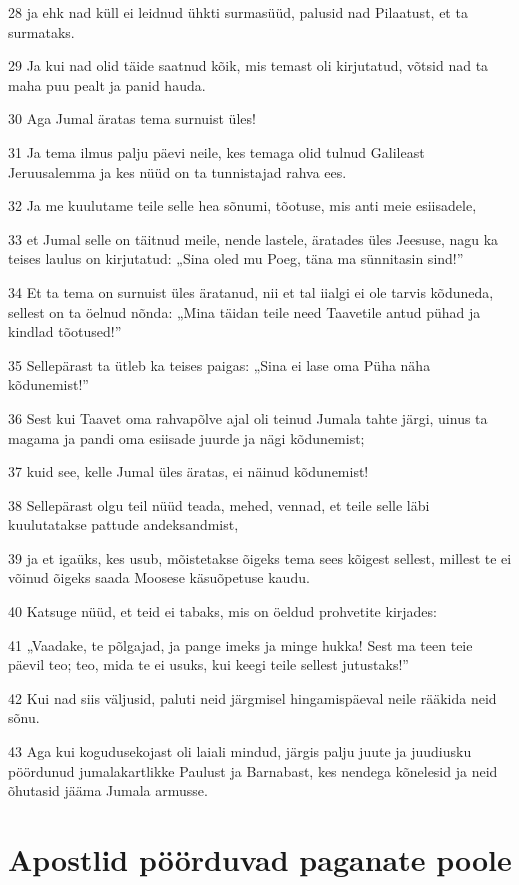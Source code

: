 \par 28 ja ehk nad küll ei leidnud ühkti surmasüüd, palusid nad Pilaatust, et ta surmataks.
\par 29 Ja kui nad olid täide saatnud kõik, mis temast oli kirjutatud, võtsid nad ta maha puu pealt ja panid hauda.
\par 30 Aga Jumal äratas tema surnuist üles!
\par 31 Ja tema ilmus palju päevi neile, kes temaga olid tulnud Galileast Jeruusalemma ja kes nüüd on ta tunnistajad rahva ees.
\par 32 Ja me kuulutame teile selle hea sõnumi, tõotuse, mis anti meie esiisadele,
\par 33 et Jumal selle on täitnud meile, nende lastele, äratades üles Jeesuse, nagu ka teises laulus on kirjutatud: „Sina oled mu Poeg, täna ma sünnitasin sind!”
\par 34 Et ta tema on surnuist üles äratanud, nii et tal iialgi ei ole tarvis kõduneda, sellest on ta öelnud nõnda: „Mina täidan teile need Taavetile antud pühad ja kindlad tõotused!”
\par 35 Sellepärast ta ütleb ka teises paigas: „Sina ei lase oma Püha näha kõdunemist!”
\par 36 Sest kui Taavet oma rahvapõlve ajal oli teinud Jumala tahte järgi, uinus ta magama ja pandi oma esiisade juurde ja nägi kõdunemist;
\par 37 kuid see, kelle Jumal üles äratas, ei näinud kõdunemist!
\par 38 Sellepärast olgu teil nüüd teada, mehed, vennad, et teile selle läbi kuulutatakse pattude andeksandmist,
\par 39 ja et igaüks, kes usub, mõistetakse õigeks tema sees kõigest sellest, millest te ei võinud õigeks saada Moosese käsuõpetuse kaudu.
\par 40 Katsuge nüüd, et teid ei tabaks, mis on öeldud prohvetite kirjades:
\par 41 „Vaadake, te põlgajad, ja pange imeks ja minge hukka! Sest ma teen teie päevil teo; teo, mida te ei usuks, kui keegi teile sellest jutustaks!”
\par 42 Kui nad siis väljusid, paluti neid järgmisel hingamispäeval neile rääkida neid sõnu.
\par 43 Aga kui kogudusekojast oli laiali mindud, järgis palju juute ja juudiusku pöördunud jumalakartlikke Paulust ja Barnabast, kes nendega kõnelesid ja neid õhutasid jääma Jumala armusse.

\section*{Apostlid pöörduvad paganate poole}

